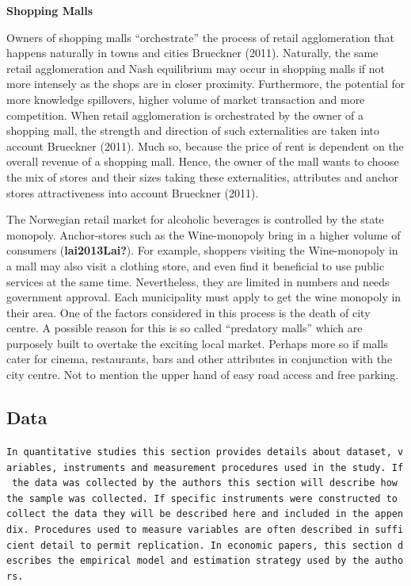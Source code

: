 \documentclass[
  10,
  a4paper,
]{article}
\begin{document}
\textbf{Shopping Malls}

Owners of shopping malls ``orchestrate'' the process of retail
agglomeration that happens naturally in towns and cities Brueckner
(2011). Naturally, the same retail agglomeration and Nash equilibrium
may occur in shopping malls if not more intensely as the shops are in
closer proximity. Furthermore, the potential for more knowledge
spillovers, higher volume of market transaction and more competition.
When retail agglomeration is orchestrated by the owner of a shopping
mall, the strength and direction of such externalities are taken into
account Brueckner (2011). Much so, because the price of rent is
dependent on the overall revenue of a shopping mall. Hence, the owner of
the mall wants to choose the mix of stores and their sizes taking these
externalities, attributes and anchor stores attractiveness into account
Brueckner (2011).

The Norwegian retail market for alcoholic beverages is controlled by the
state monopoly. Anchor-stores such as the Wine-monopoly bring in a
higher volume of consumers (\textbf{lai2013Lai?}). For example, shoppers
visiting the Wine-monopoly in a mall may also visit a clothing store,
and even find it beneficial to use public services at the same time.
Nevertheless, they are limited in numbers and needs government approval.
Each municipality must apply to get the wine monopoly in their area. One
of the factors considered in this process is the death of city centre. A
possible reason for this is so called ``predatory malls'' which are
purposely built to overtake the exciting local market. Perhaps more so
if malls cater for cinema, restaurants, bars and other attributes in
conjunction with the city centre. Not to mention the upper hand of easy
road access and free parking.

\hypertarget{data}{%
\subsection{Data}\label{data}}

\texttt{In\ quantitative\ studies\ this\ section\ provides\ details\ about\ dataset,\ variables,\ instruments\ and\ measurement\ procedures\ used\ in\ the\ study.\ If\ the\ data\ was\ collected\ by\ the\ authors\ this\ section\ will\ describe\ how\ the\ sample\ was\ collected.\ If\ specific\ instruments\ were\ constructed\ to\ collect\ the\ data\ they\ will\ be\ described\ here\ and\ included\ in\ the\ appendix.\ Procedures\ used\ to\ measure\ variables\ are\ often\ described\ in\ sufficient\ detail\ to\ permit\ replication.\ In\ economic\ papers,\ this\ section\ describes\ the\ empirical\ model\ and\ estimation\ strategy\ used\ by\ the\ authors.}
\end{document}
